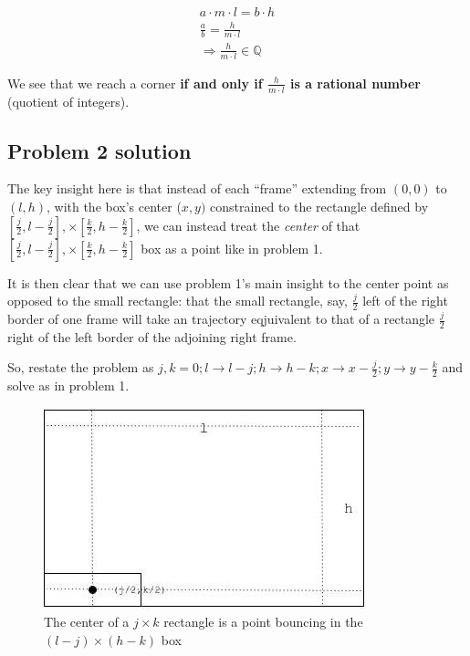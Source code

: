 \documentclass[11pt, oneside]{article} 	%
\begin{document}
\begin{align}
a \cdot m \cdot l = b \cdot h \\
\frac{a}{b} = \frac{h}{m \cdot l} \\ 
\Rightarrow \frac{h}{m \cdot l} \in \mathbb{Q} 
\end{align}

We see that we reach a corner \textbf{if and only if $\frac{h}{m \cdot l}$ is a rational number} (quotient of integers).



\subsection{Problem 2 solution}

The key insight here is that instead of each ``frame'' extending from $(0, 0)$ to $(l, h)$, with the box's center ($x, y)$ constrained to the rectangle defined by $[\frac{j}{2}, l - \frac{j}{2}], \times [\frac{k}{2}, h - \frac{k}{2}]$, we can instead treat the \emph{center} of that $[\frac{j}{2}, l - \frac{j}{2}], \times [\frac{k}{2}, h - \frac{k}{2}]$ box as a point like in problem 1. 

It is then clear that we can use problem 1's main insight to the center point as opposed to the small rectangle: that the small rectangle, say, $\frac{j}{2}$ left of the right border of one frame will take an trajectory eqjuivalent to that of a rectangle $\frac{j}{2}$ right of the left border of the adjoining right frame.

So, restate the problem as $j, k = 0; l \rightarrow l - j; h \rightarrow h - k;  x \rightarrow x - \frac{j}{2}; y \rightarrow y - \frac{k}{2}$ and solve as in problem 1.

\begin{figure}[!htb]
\centering
\includegraphics[scale=.4]{problem2}
\caption{The center of a $j \times k$ rectangle is a point bouncing in the $(l - j) \times (h - k)$ box}
\end{figure}
\end{document}
